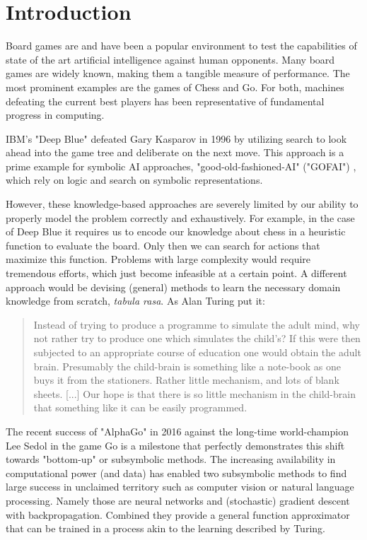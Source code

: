 \chapter{Introduction}

Board games are and have been a popular environment to test the capabilities of state of the art artificial intelligence against human opponents. Many board games are widely known, making them a tangible measure of performance. The most prominent examples are the games of Chess and Go. For both, machines defeating the current best players has been representative of fundamental progress in computing.

IBM's "Deep Blue" defeated Gary Kasparov in 1996 \cite{higgins_brief_2017} by utilizing search to look ahead into the game tree and deliberate on the next move. This approach is a prime example for symbolic AI approaches, "good-old-fashioned-AI" ("GOFAI") \cite[p. 112f]{haugeland_artificial_1985}, which rely on logic and search on symbolic representations.

However, these knowledge-based approaches are severely limited by our ability to properly model the problem correctly and exhaustively. For example, in the case of Deep Blue it requires us to encode our knowledge about chess in a heuristic function to evaluate the board. Only then we can search for actions that maximize this function. Problems with large complexity would require tremendous efforts, which just become infeasible at a certain point. A different approach would be devising (general) methods to learn the necessary domain knowledge from scratch,  \emph{tabula rasa}. As Alan Turing put it:

\begin{quote}
    Instead of trying to produce a programme to simulate the adult mind, why not rather try to produce one which simulates the child’s? If this were then subjected to an appropriate course of education one would obtain the adult brain. Presumably the child-brain is something like a note-book as one buys it from the stationers. Rather little mechanism, and lots of blank sheets. [...] Our hope is that there is so little mechanism in the child-brain that something like it can be easily programmed.
    \cite{turing_icomputing_1950}
\end{quote}

The recent success of "AlphaGo" in 2016 against the long-time world-champion Lee Sedol \cite{deepmind_match_nodate} in the game Go is a milestone that perfectly demonstrates this shift towards "bottom-up" or subsymbolic methods. \cite{nilsson_artificial_1998} The increasing availability in computational power (and data) has enabled two subsymbolic methods to find large success in unclaimed territory such as computer vision or natural language processing. Namely those are neural networks and (stochastic) gradient descent with backpropagation. Combined they provide a general function approximator that can be trained in a process akin to the learning described by Turing.

